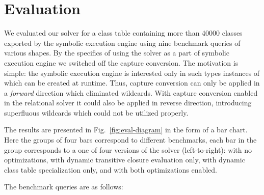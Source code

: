 \section{Evaluation}
\label{sec:eval}

We evaluated our solver for a class table containing more than 40000 classes exported by the symbolic execution engine using
nine benchmark queries of various shapes. By the specifics of using the solver as a part of symbolic execution engine we
switched off the capture conversion. The motivation is simple: the symbolic execution engine is interested only in
such types instances of which can be created at runtime. Thus, capture conversion can only be applied in a \emph{forward}
direction which eliminated wildcards. With capture conversion enabled in the relational solver it could also be
applied in reverse direction, introducing superfluous wildcards which could not be utilized properly.

The results are presented in Fig.~\ref{fig:eval-diagram} in the form of
a bar chart. Here the groups of four bars correspond to different benchmarks, each bar in the group corresponds to a one of
four versions of the solver (left-to-right): with no optimizations, with dynamic transitive closure evaluation only, with dynamic class table specialization only,
and with both optimizations enabled.

The benchmark queries are as follows:

